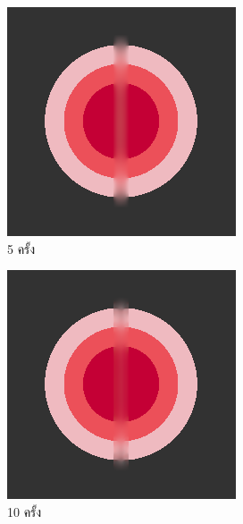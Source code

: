 

\begin{figure}[H]
    \centering
    \begin{subfigure}{0.4\linewidth}
        \centering
        \includegraphics[width=0.7\linewidth]{image/just10enough/only5time.png}
        \caption{5 ครั้ง}
    \end{subfigure}
    \begin{subfigure}{0.4\linewidth}
        \centering
        \includegraphics[width=0.7\linewidth]{image/just10enough/only10time.png}
        \caption{10 ครั้ง}
    \end{subfigure}
    \begin{subfigure}{0.4\linewidth}
        \centering

\end{subfigure}
\end{figure}
